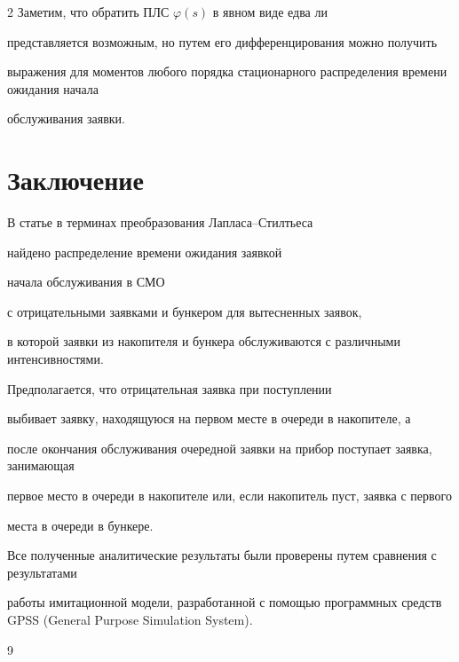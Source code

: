 \begin{multicols}{2}
Заметим, что обратить ПЛС $\varphi(s)$ в явном виде едва ли


представляется возможным, но путем его дифференцирования можно получить


выражения для моментов любого порядка стационарного распределения времени ожидания начала


обслуживания заявки.





\section{Заключение}





В статье в терминах преобразования Лап\-ла\-са--Стилть\-еса


найдено распределение времени ожидания заявкой 


начала обслуживания в СМО


с отрицательными заявками и бункером для вытесненных заявок,


в которой заявки из накопителя и бункера обслуживаются с различными интенсивностями.


Предполагается, что отрицательная заявка при поступлении


выбивает заявку, находящуюся на первом месте в очереди в накопителе, а


после окончания обслуживания очередной заявки на прибор поступает заявка, занимающая


первое место в очереди в накопителе или, если накопитель пуст, заявка с первого


места в очереди в бункере.





Все полученные аналитические результаты были проверены путем сравнения с результатами


работы имитационной модели, разработанной с помощью программных средств GPSS (General Purpose Simulation System).








{\small\frenchspacing


{%




\begin{thebibliography}{9}






\end{thebibliography}}}
\end{multicols}
